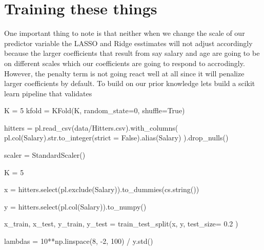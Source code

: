 \documentclass[
  letterpaper,
  DIV=11,
  numbers=noendperiod]{scrreprt}
\newenvironment{Shaded}{\begin{snugshade}}{\end{snugshade}}
\newcommand{\BuiltInTok}[1]{\textcolor[rgb]{0.00,0.23,0.31}{#1}}
\newcommand{\DecValTok}[1]{\textcolor[rgb]{0.68,0.00,0.00}{#1}}
\newcommand{\FloatTok}[1]{\textcolor[rgb]{0.68,0.00,0.00}{#1}}
\newcommand{\NormalTok}[1]{\textcolor[rgb]{0.00,0.23,0.31}{#1}}
\newcommand{\OperatorTok}[1]{\textcolor[rgb]{0.37,0.37,0.37}{#1}}
\newcommand{\StringTok}[1]{\textcolor[rgb]{0.13,0.47,0.30}{#1}}
\newcommand{\VariableTok}[1]{\textcolor[rgb]{0.07,0.07,0.07}{#1}}
\begin{document}
\section{Training these things}\label{training-these-things}

One important thing to note is that neither when we change the scale of
our predictor variable the LASSO and Ridge esstimates will not adjust
accordingly because the larger coefficients that result from say salary
and age are going to be on different scales which our coefficients are
going to respond to accrodingly. However, the penalty term is not going
react well at all since it will penalize larger coefficients by default.
To build on our prior knowledge lets build a scikit learn pipeline that
validates

\begin{Shaded}
\begin{Highlighting}[]
\NormalTok{K }\OperatorTok{=} \DecValTok{5}
\NormalTok{kfold }\OperatorTok{=}\NormalTok{ KFold(K,}
\NormalTok{                  random\_state}\OperatorTok{=}\DecValTok{0}\NormalTok{,}
\NormalTok{                  shuffle}\OperatorTok{=}\VariableTok{True}\NormalTok{)}

\NormalTok{hitters }\OperatorTok{=}\NormalTok{ pl.read\_csv(}\StringTok{\textquotesingle{}data/Hitters.csv\textquotesingle{}}\NormalTok{).with\_columns(}
\NormalTok{     pl.col(}\StringTok{\textquotesingle{}Salary\textquotesingle{}}\NormalTok{).}\BuiltInTok{str}\NormalTok{.to\_integer(strict }\OperatorTok{=} \VariableTok{False}\NormalTok{).alias(}\StringTok{\textquotesingle{}Salary\textquotesingle{}}\NormalTok{)}
\NormalTok{).drop\_nulls()}

\NormalTok{scaler }\OperatorTok{=}\NormalTok{ StandardScaler()}

\NormalTok{K }\OperatorTok{=} \DecValTok{5}

\NormalTok{x }\OperatorTok{=}\NormalTok{ hitters.select(pl.exclude(}\StringTok{\textquotesingle{}Salary\textquotesingle{}}\NormalTok{)).to\_dummies(cs.string())}

\NormalTok{y }\OperatorTok{=}\NormalTok{ hitters.select(pl.col(}\StringTok{\textquotesingle{}Salary\textquotesingle{}}\NormalTok{)).to\_numpy()}

\NormalTok{x\_train, x\_test, y\_train, y\_test }\OperatorTok{=}\NormalTok{ train\_test\_split(x, y, test\_size}\OperatorTok{=} \FloatTok{0.2}\NormalTok{ )}

\NormalTok{lambdas }\OperatorTok{=} \DecValTok{10}\OperatorTok{**}\NormalTok{np.linspace(}\DecValTok{8}\NormalTok{, }\OperatorTok{{-}}\DecValTok{2}\NormalTok{, }\DecValTok{100}\NormalTok{) }\OperatorTok{/}\NormalTok{ y.std()}


\end{Highlighting}
\end{Shaded}
\end{document}
